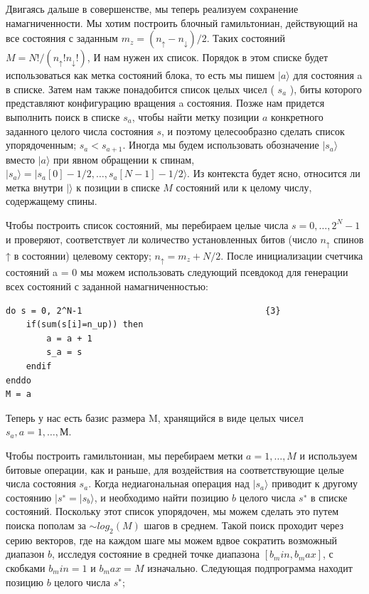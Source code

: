 \documentclass[11pt]{article}
\begin{document}
Двигаясь дальше в совершенстве, мы теперь реализуем сохранение намагниченности. Мы хотим построить блочный гамильтониан, действующий на все состояния с заданным $m_z = (n_↑ - n_↓) / 2$. Таких состояний $M = N! / (n_↑! n_↓!)$, И нам нужен их список. Порядок в этом списке будет использоваться как метка состояний блока, то есть мы пишем $| a\rangle$ для состояния a в списке. Затем нам также понадобится список целых чисел ( $s_a$ ), 
биты которого представляют конфигурацию вращения a  состояния. Позже нам придется выполнить поиск в списке $s_a$, чтобы найти метку позиции $a$ конкретного заданного целого числа состояния $s$, и поэтому целесообразно сделать список 
упорядоченным; $s_a < s_{a+1} $. 
Иногда мы будем использовать обозначение $| s_a \rangle $ вместо $| a \rangle$ при явном обращении к спинам, $| s_a \rangle = | s_a[0] - 1/2,\dots, s_a [N - 1] - 1 / 2 \rangle$. Из контекста будет ясно, относится ли метка внутри $| \rangle $ к позиции в списке $M$ состояний или к целому числу, содержащему спины.

Чтобы построить список состояний, мы перебираем целые числа $s = 0,\dots, 2^N - 1$ и проверяют, соответствует ли количество установленных битов (число $n_↑$ спинов ↑ в состоянии) целевому сектору; $n_↑ = m_z + N / 2$. После инициализации счетчика состояний a = 0 мы можем использовать следующий псевдокод для генерации всех состояний с заданной намагниченностью:

\begin{lstlisting}
do s = 0, 2^N-1                                    {3}
    if(sum(s[i]=n_up)) then
    	a = a + 1
	    s_a = s
    endif
enddo
M = a
\end{lstlisting}

Теперь у нас есть базис размера M, хранящийся в виде целых чисел $s_a, a = 1,\dots , М$.

Чтобы построить гамильтониан, мы перебираем метки $a = 1, \dots, M$ и используем битовые операции, как и раньше, для воздействия на соответствующие целые числа состояния $s_a$. Когда недиагональная операция над $| s_a \rangle$ приводит к другому состоянию $| s^{∗} = | s_b \rangle$, и необходимо найти позицию $b$ целого числа $s^{∗}$ в списке состояний. Поскольку этот список упорядочен, мы можем сделать это путем поиска пополам за $\sim log_2(M)$ шагов в среднем. Такой поиск проходит через серию векторов, где на каждом шаге мы можем вдвое сократить возможный диапазон $b$, исследуя состояние в средней точке диапазона $[b_min, b_max]$, с скобками $b_min = 1$ и $b_max = M$ изначально. Следующая подпрограмма находит позицию $b$ целого числа $s^∗$;
\end{document}
